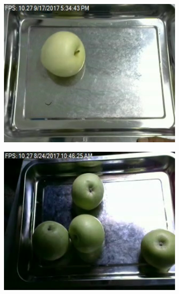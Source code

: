 \documentclass[a4,german]{article}
\begin{document}
\begin{figure}[b] %
\begin{subfigure}[c]{0.245\textwidth}
\includegraphics[width=1\textwidth]{Apple_Green_44.png} 
\subcaption{}
\end{subfigure}
\begin{subfigure}[c]{0.245\textwidth}
\includegraphics[width=1\textwidth]{Apple_Green_50.png}
\subcaption{}
\end{subfigure}
\begin{subfigure}[c]{0.245\textwidth}

\end{subfigure}
\end{figure}
\end{document}
